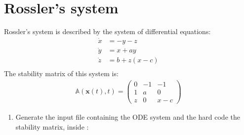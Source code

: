 \documentclass[letterpaper,10pt,english,openany,oneside]{sphinxmanual}
\begin{document}
\section{Rossler’s system}
\label{\detokenize{tutorial/rossler:rossler-s-system}}\label{\detokenize{tutorial/rossler::doc}}
Rossler’s system is described by the system of differential equations:
\begin{equation*}
\begin{split}\dot{x}&= -y - z\\
\dot{y} &= x + ay \\
\dot{z} &= b + z(x-c) \\\end{split}
\end{equation*}
The stability matrix of this system is:
\begin{equation*}
\begin{split}\begin{equation}
\mathbb{A}(\mathbf{x}(t), t) =
\begin{pmatrix}
0 & -1 & -1\\
1 & a & 0\\
z & 0 & x-c
\end{pmatrix}
\end{equation}\end{split}
\end{equation*}\begin{enumerate}
%
\item {} 
Generate the input file containing the ODE system and the hard code the stability matrix, inside :

\end{enumerate}
\end{document}
